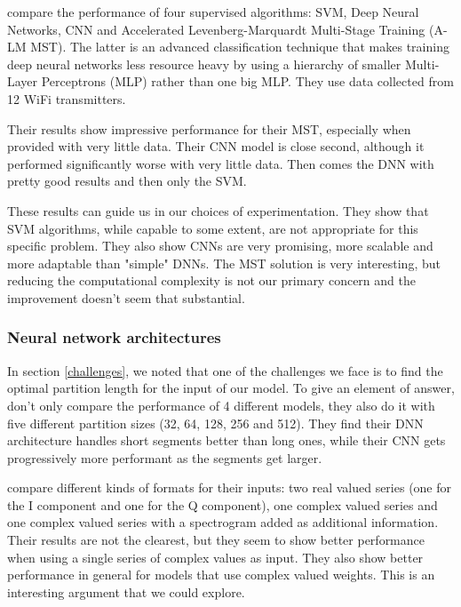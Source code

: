 \textcite{youssef_machine_2017} compare the performance of four supervised algorithms: SVM, Deep Neural Networks, CNN and Accelerated Levenberg-Marquardt Multi-Stage Training (A-LM MST). The latter is an advanced classification technique that makes training deep neural networks less resource heavy by using a hierarchy of smaller Multi-Layer Perceptrons (MLP) rather than one big MLP. They use data collected from 12 WiFi transmitters.

Their results show impressive performance for their MST, especially when provided with very little data. Their CNN model is close second, although it performed significantly worse with very little data. Then comes the DNN with pretty good results and then only the SVM.

These results can guide us in our choices of experimentation. They show that SVM algorithms, while capable to some extent, are not appropriate for this specific problem. They also show CNNs are very promising, more scalable and more adaptable than "simple" DNNs. The MST solution is very interesting, but reducing the computational complexity is not our primary concern and the improvement doesn't seem that substantial.

\subsubsection{Neural network architectures} \label{nn-architecture}

In section \ref{challenges}, we noted that one of the challenges we face is to find the optimal partition length for the input of our model. To give an element of answer, \textcite{youssef_machine_2017} don't only compare the performance of 4 different models, they also do it with five different partition sizes (32, 64, 128, 256 and 512). They find their DNN architecture handles short segments better than long ones, while their CNN gets progressively more performant as the segments get larger.

\textcite{stankowicz_complex_2019} compare different kinds of formats for their inputs: two real valued series (one for the I component and one for the Q component), one complex valued series and one complex valued series with a spectrogram added as additional information. Their results are not the clearest, but they seem to show better performance when using a single series of complex values as input. They also show better performance in general for models that use complex valued weights. This is an interesting argument that we could explore.

